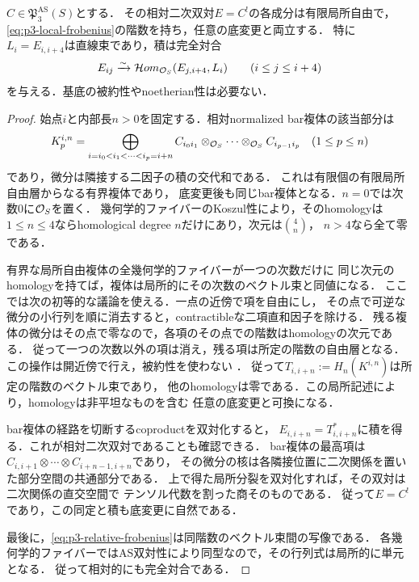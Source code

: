 \begin{lemma}[相対Koszul双対は全底変更と両立する]
\label{lem:p3-relative-bar}
$C\in\mathfrak P_3^{\mathrm{AS}}(S)$とする．
その相対二次双対$E=C^!$の各成分は有限局所自由で，
\eqref{eq:p3-local-frobenius}の階数を持ち，任意の底変更と両立する．
特に$L_i=E_{i,i+4}$は直線束であり，積は完全対合
\begin{equation}\label{eq:p3-relative-frobenius}
 E_{ij}\xrightarrow{\sim}
 \mathcal Hom_{\mathcal O_S}(E_{j,i+4},L_i)
 \qquad(i\le j\le i+4)
\end{equation}
を与える．基底の被約性やnoetherian性は必要ない．
\end{lemma}
\begin{proof}
始点$i$と内部長$n>0$を固定する．相対normalized bar複体の該当部分は
\begin{equation}\label{eq:p3-bar-complex}
 K^{i,n}_p=
 \bigoplus_{i=i_0<i_1<\cdots<i_p=i+n}
 C_{i_0i_1}\otimes_{\mathcal O_S}\cdots\otimes_{\mathcal O_S}C_{i_{p-1}i_p}
 \quad(1\le p\le n)
\end{equation}
であり，微分は隣接する二因子の積の交代和である．
これは有限個の有限局所自由層からなる有界複体であり，
底変更後も同じbar複体となる．$n=0$では次数0に$\mathcal O_S$を置く．
幾何学的ファイバーのKoszul性により，そのhomologyは
$1\le n\le4$ならhomological degree $n$だけにあり，次元は$\binom4n$，
$n>4$なら全て零である．

有界な局所自由複体の全幾何学的ファイバーが一つの次数だけに
同じ次元のhomologyを持てば，複体は局所的にその次数のベクトル束と同値になる．
ここでは次の初等的な議論を使える．一点の近傍で項を自由にし，
その点で可逆な微分の小行列を順に消去すると，contractibleな二項直和因子を除ける．
残る複体の微分はその点で零なので，各項のその点での階数はhomologyの次元である．
従って一つの次数以外の項は消え，残る項は所定の階数の自由層となる．
この操作は開近傍で行え，被約性を使わない
\cite[Tags~0BDK, 0BCD]{StacksPerfect}．
従って$T_{i,i+n}:=H_n(K^{i,n})$は所定の階数のベクトル束であり，
他のhomologyは零である．この局所記述により，homologyは非平坦なものを含む
任意の底変更と可換になる．

bar複体の経路を切断するcoproductを双対化すると，
$E_{i,i+n}=T_{i,i+n}^*$に積を得る．これが相対二次双対であることも確認できる．
bar複体の最高項は$C_{i,i+1}\otimes\cdots\otimes C_{i+n-1,i+n}$であり，
その微分の核は各隣接位置に二次関係を置いた部分空間の共通部分である．
上で得た局所分裂を双対化すれば，その双対は二次関係の直交空間で
テンソル代数を割った商そのものである．
従って$E=C^!$であり，この同定と積も底変更に自然である．

最後に，\eqref{eq:p3-relative-frobenius}は同階数のベクトル束間の写像である．
各幾何学的ファイバーではAS双対性により同型なので，その行列式は局所的に単元となる．
従って相対的にも完全対合である．
\end{proof}

